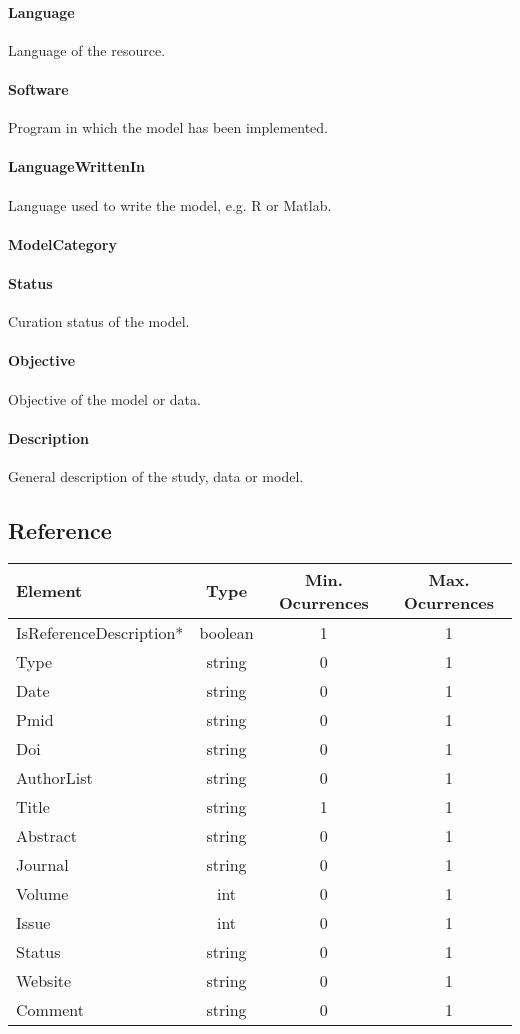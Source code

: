 \documentclass[a4paper]{report}
\begin{document}
\paragraph{Language}
Language of the resource.

\paragraph{Software}
Program in which the model has been implemented.

\paragraph{LanguageWrittenIn}
Language used to write the model, e.g. R or Matlab.

\paragraph{ModelCategory}

\paragraph{Status}
Curation status of the model.

\paragraph{Objective}
Objective of the model or data.

\paragraph{Description}
General description of the study, data or model.

\subsection{Reference}

\begin{tabular}{|l|c|c|c|}
    \hline
    \textbf{Element} & \textbf{Type} & \textbf{Min. Ocurrences} & \textbf{Max. Ocurrences} \\
    \hline
    IsReferenceDescription* & boolean & 1 & 1 \\
    Type & string & 0 & 1 \\
    Date & string & 0 & 1 \\
    Pmid & string & 0 & 1 \\
    Doi & string & 0 & 1 \\
    AuthorList & string & 0 & 1\\
    Title & string & 1 & 1\\
    Abstract & string & 0 & 1 \\
    Journal & string & 0 & 1\\
    Volume & int & 0 & 1 \\
    Issue & int & 0 & 1 \\
    Status & string & 0 & 1 \\
    Website & string & 0 & 1 \\
    Comment & string & 0 & 1 \\
    \hline
\end{tabular}
\end{document}
